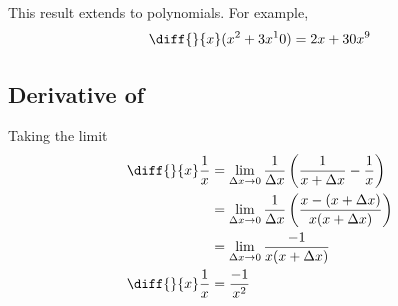 This result extends to polynomials. For example, $$ \diff{}{x}(x^2+3x^10) = 2x + 30x^9 $$

\subsection{Derivative of }
Taking the limit
\begin{align*}
	\diff{}{x} \frac{1}{x} 
		& = \lim_{\Delta x \to 0} \frac{1}{\Delta x} \left( \frac{1}{x+\Delta x} - \frac{1}{x} \right) \\
		& = \lim_{\Delta x \to 0} \frac{1}{\Delta x} \left( \frac{x - (x+\Delta x)}{x(x+\Delta x)} \right) \\
		& = \lim_{\Delta x \to 0} \frac{-1}{x(x+\Delta x)} \\
	\diff{}{x} \frac{1}{x} & = \frac{-1}{x^2}
\end{align*}
